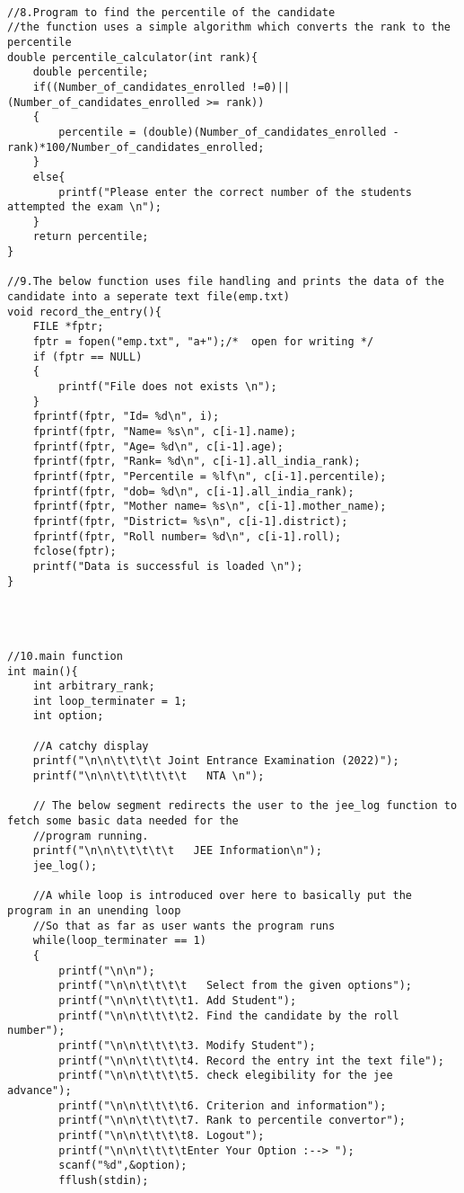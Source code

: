 \documentclass{article}
\begin{document}
\begin{FlushLeft}
\begin{verbatim}
   



//8.Program to find the percentile of the candidate
//the function uses a simple algorithm which converts the rank to the percentile
double percentile_calculator(int rank){
    double percentile;
    if((Number_of_candidates_enrolled !=0)|| (Number_of_candidates_enrolled >= rank))
    {
        percentile = (double)(Number_of_candidates_enrolled - rank)*100/Number_of_candidates_enrolled;
    }
    else{
        printf("Please enter the correct number of the students attempted the exam \n");
    }
    return percentile;
}

//9.The below function uses file handling and prints the data of the candidate into a seperate text file(emp.txt)
void record_the_entry(){
    FILE *fptr; 
    fptr = fopen("emp.txt", "a+");/*  open for writing */  
    if (fptr == NULL)  
    {  
        printf("File does not exists \n");
    }   
    fprintf(fptr, "Id= %d\n", i);   
    fprintf(fptr, "Name= %s\n", c[i-1].name);
    fprintf(fptr, "Age= %d\n", c[i-1].age); 
    fprintf(fptr, "Rank= %d\n", c[i-1].all_india_rank);
    fprintf(fptr, "Percentile = %lf\n", c[i-1].percentile);
    fprintf(fptr, "dob= %d\n", c[i-1].all_india_rank);
    fprintf(fptr, "Mother name= %s\n", c[i-1].mother_name);
    fprintf(fptr, "District= %s\n", c[i-1].district);
    fprintf(fptr, "Roll number= %d\n", c[i-1].roll);  
    fclose(fptr); 
    printf("Data is successful is loaded \n"); 
}




//10.main function
int main(){
    int arbitrary_rank;
    int loop_terminater = 1;
    int option;

    //A catchy display
    printf("\n\n\t\t\t\t Joint Entrance Examination (2022)");
    printf("\n\n\t\t\t\t\t\t   NTA \n");

    // The below segment redirects the user to the jee_log function to fetch some basic data needed for the 
    //program running.
    printf("\n\n\t\t\t\t\t   JEE Information\n");
    jee_log();

    //A while loop is introduced over here to basically put the program in an unending loop
    //So that as far as user wants the program runs
    while(loop_terminater == 1)
    {
        printf("\n\n");
        printf("\n\n\t\t\t\t   Select from the given options");
        printf("\n\n\t\t\t\t1. Add Student");
        printf("\n\n\t\t\t\t2. Find the candidate by the roll number");
        printf("\n\n\t\t\t\t3. Modify Student");
        printf("\n\n\t\t\t\t4. Record the entry int the text file");
        printf("\n\n\t\t\t\t5. check elegibility for the jee advance");
        printf("\n\n\t\t\t\t6. Criterion and information");
        printf("\n\n\t\t\t\t7. Rank to percentile convertor");
        printf("\n\n\t\t\t\t8. Logout");
        printf("\n\n\t\t\t\tEnter Your Option :--> ");
        scanf("%d",&option);
        fflush(stdin);
        


\end{verbatim}
\end{FlushLeft}
\end{document}
